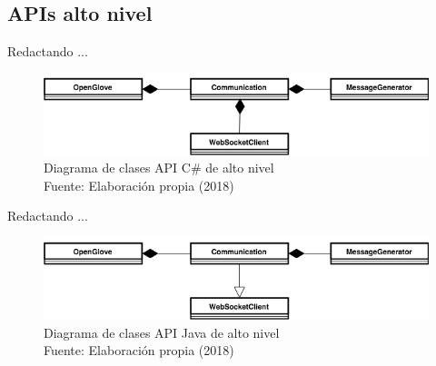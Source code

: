 \subsection{APIs alto nivel}
Redactando ...

\begin{figure}[H]
  \begin{center} 
   	\includegraphics[width=1.0\textwidth]{images/chapter04/OpenGlove-Architecture-API-CSharp-HL.png} 
    \caption[Diagrama de clases API C\# de alto nivel]{Diagrama de clases API C\# de alto nivel \\Fuente: Elaboración propia (2018)}
    \label{fig:api-csharp-hl}
  \end{center}
\end{figure}


Redactando ...

\begin{figure}[H]
  \begin{center} 
   	\includegraphics[width=1.0\textwidth]{images/chapter04/OpenGlove-Architecture-API-Java-HL.png} 
    \caption[Diagrama de clases API Java de alto nivel]{Diagrama de clases API Java de alto nivel \\Fuente: Elaboración propia (2018)}
    \label{fig:api-java-hl}
  \end{center}
\end{figure}


